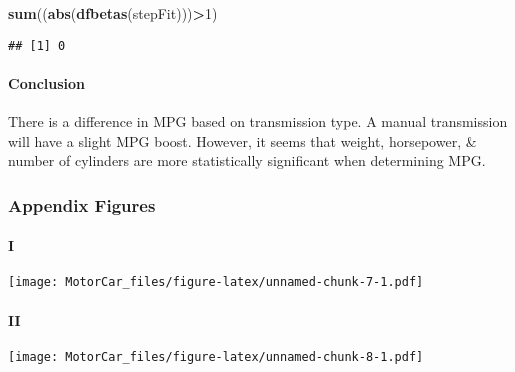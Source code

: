 \documentclass[
]{article}
\newenvironment{Shaded}{\begin{snugshade}}{\end{snugshade}}
\newcommand{\DecValTok}[1]{\textcolor[rgb]{0.00,0.00,0.81}{#1}}
\newcommand{\KeywordTok}[1]{\textcolor[rgb]{0.13,0.29,0.53}{\textbf{#1}}}
\newcommand{\NormalTok}[1]{#1}
\newcommand{\OperatorTok}[1]{\textcolor[rgb]{0.81,0.36,0.00}{\textbf{#1}}}
\begin{document}
\begin{Shaded}
\begin{Highlighting}[]
\KeywordTok{sum}\NormalTok{((}\KeywordTok{abs}\NormalTok{(}\KeywordTok{dfbetas}\NormalTok{(stepFit)))}\OperatorTok{>}\DecValTok{1}\NormalTok{)}
\end{Highlighting}
\end{Shaded}

\begin{verbatim}
## [1] 0
\end{verbatim}

\hypertarget{conclusion}{%
\paragraph{Conclusion}\label{conclusion}}

There is a difference in MPG based on transmission type. A manual
transmission will have a slight MPG boost. However, it seems that
weight, horsepower, \& number of cylinders are more statistically
significant when determining MPG.

\hypertarget{appendix-figures}{%
\subsubsection{Appendix Figures}\label{appendix-figures}}

\hypertarget{i}{%
\paragraph{I}\label{i}}

\texttt{[image: MotorCar\_files/figure-latex/unnamed-chunk-7-1.pdf]}

\hypertarget{ii}{%
\paragraph{II}\label{ii}}

\texttt{[image: MotorCar\_files/figure-latex/unnamed-chunk-8-1.pdf]}
\end{document}
